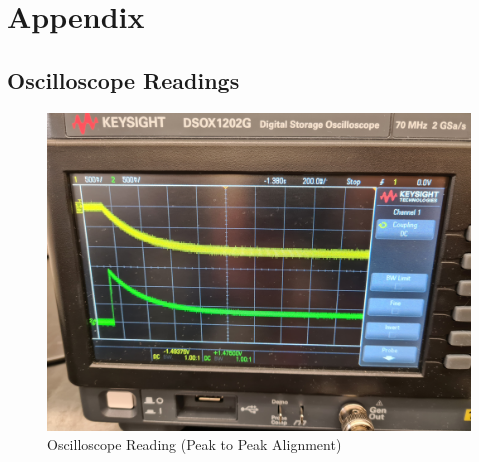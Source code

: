 \documentclass[a4paper,12pt]{article}
\begin{document}
\pagebreak

\appendix

\section{Appendix}

\subsection{Oscilloscope Readings}

\begin{figure}[H]
  \centering
  \includegraphics[width=1.0\linewidth]{../data/20211116_101002.jpg}    
  \begin{center}
    \begin{center}   
    \end{center}  \end{center}
  \caption{Oscilloscope Reading (Peak to Peak Alignment)}
  \label{osc}
\end{figure}
\end{document}
